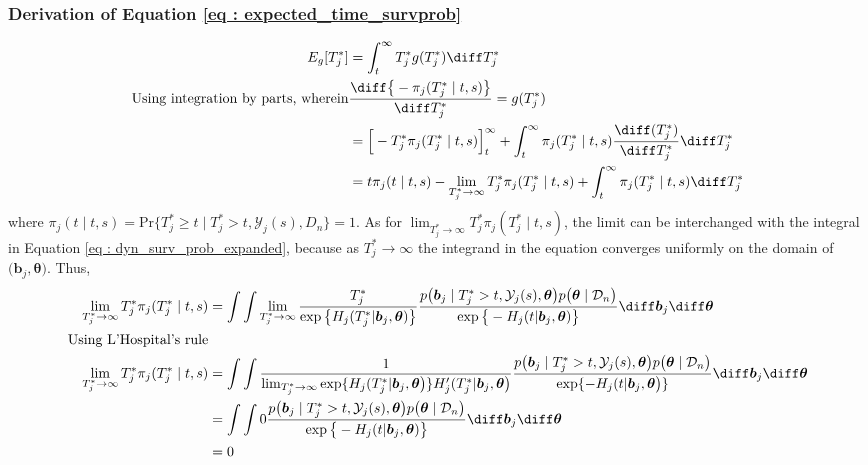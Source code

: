 \subsubsection{Derivation of Equation \ref{eq : expected_time_survprob}}
\label{subsubsec : deriv_eq_7}
\begin{equation*}
\begin{split}
E_g[T^*_j] &= \int_t^{\infty} T^*_j g(T^*_j)\diff T^*_j\\
\text{Using integration by parts, wherein} & \frac{\diff \big\{-\pi_j(T^*_j \mid t, s)\big\}}{\diff T^*_j} = g(T^*_j)\\
&= \Big[-T^*_j\pi_j(T^*_j \mid t, s)\Big]_t^\infty + \int_t^{\infty} \pi_j(T^*_j \mid t, s) \frac{\diff (T^*_j)}{\diff T^*_j} \diff T^*_j\\
&= t \pi_j(t \mid t, s) - \lim_{T^*_j\to \infty}T^*_j \pi_j(T^*_j \mid t, s) + \int_t^{\infty} \pi_j(T^*_j \mid t, s) \diff T^*_j\\
\end{split}
\end{equation*}
where $\pi_j(t \mid t, s) = \mbox{Pr}\big\{T^*_j \geq t \mid  T^*_j >t, \mathcal{Y}_j(s), D_n\big\} = 1$. As for $\lim_{T^*_j\to \infty}T^*_j \pi_j(T^*_j \mid t, s)$, the limit can be interchanged with the integral in Equation \ref{eq : dyn_surv_prob_expanded}, because as $T^*_j\to \infty$ the integrand in the equation converges uniformly on the domain of $(\boldsymbol{b}_j, \boldsymbol{\theta}\big)$. Thus,
\begin{equation*}
\begin{split}
\lim_{T^*_j\to \infty}T^*_j \pi_j(T^*_j \mid t, s) &=  \int \int \lim_{T^*_j\to \infty} \frac{T^*_j}{\exp\big\{H_j(T^*_j | \boldsymbol{b}_j, \boldsymbol{\theta})\big\}} \frac{p\big(\boldsymbol{b}_j \mid T^*_j>t, \mathcal{Y}_j(s), \boldsymbol{\theta}\big)p\big(\boldsymbol{\theta} \mid \mathcal{D}_n\big)}{\exp\big\{-H_j(t | \boldsymbol{b}_j, \boldsymbol{\theta})\big\}}  \diff \boldsymbol{b}_j \diff \boldsymbol{\theta}\\
\text{Using L'Hospital's rule}\\
\lim_{T^*_j\to \infty}T^*_j \pi_j(T^*_j \mid t, s) &=  \int \int \frac{1}{\lim_{T^*_j\to \infty} \exp\{H_j(T^*_j | \boldsymbol{b}_j, \boldsymbol{\theta}\big)\}H'_j(T^*_j | \boldsymbol{b}_j, \boldsymbol{\theta}\big)} \frac{p\big(\boldsymbol{b}_j \mid T^*_j>t, \mathcal{Y}_j(s), \boldsymbol{\theta}\big)p\big(\boldsymbol{\theta} \mid \mathcal{D}_n\big)}{\exp\{-H_j(t | \boldsymbol{b}_j, \boldsymbol{\theta}\big)\}} \diff \boldsymbol{b}_j \diff \boldsymbol{\theta}\\
&= \int \int 0 \frac{p\big(\boldsymbol{b}_j \mid T^*_j>t, \mathcal{Y}_j(s), \boldsymbol{\theta}\big)p\big(\boldsymbol{\theta} \mid \mathcal{D}_n\big)}{\exp\big\{-H_j(t | \boldsymbol{b}_j, \boldsymbol{\theta})\big\}}  \diff \boldsymbol{b}_j \diff \boldsymbol{\theta}\\
&= 0
\end{split}
\end{equation*}

